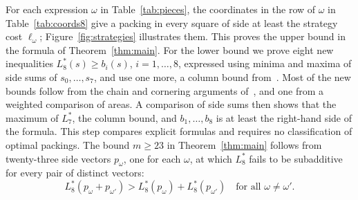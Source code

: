 \documentclass[12pt]{amsart}
\theoremstyle{definition}
\theoremstyle{remark}
\numberwithin{equation}{section}
\numberwithin{figure}{section}
\numberwithin{table}{section}
\begin{document}
For each expression $\omega$ in Table~\ref{tab:pieces}, the coordinates in
the row of $\omega$ in Table~\ref{tab:coords8} give a packing in every square
of side at least the strategy cost $\ell_\omega$; Figure~\ref{fig:strategies}
illustrates them. This proves the upper bound in the formula
of Theorem~\ref{thm:main}. For the lower bound we prove eight new
inequalities $L_8^*(s)\ge b_i(s)$, $i=1,\ldots,8$, expressed using minima
and maxima of side sums of $s_0,\ldots,s_7$, and use one more, a column
bound from~\cite{BadgerSeven}. Most of the new bounds follow from the
chain and cornering arguments of~\cite{BadgerSeven}, and one from a weighted
comparison of areas. A comparison of side sums then shows that the maximum
of $L_7^*$, the column bound, and $b_1,\ldots,b_8$ is at least the
right-hand side of the formula. This step compares
explicit formulas and requires no classification of optimal packings. The
bound $m\ge23$ in Theorem~\ref{thm:main} follows from twenty-three
side vectors $p_\omega$, one for each $\omega$, at which $L_8^*$ fails to be
subadditive for every pair of distinct vectors:
\[
L_8^*(p_\omega+p_{\omega'})>L_8^*(p_\omega)+L_8^*(p_{\omega'})\quad\text{for all }\omega\ne\omega'.
\]
\end{document}
